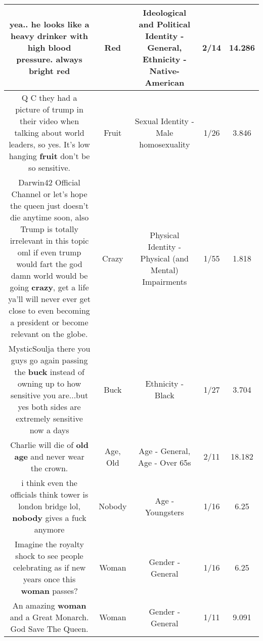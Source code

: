 \documentclass[11pt]{article}
\newlength\mylength
\begin{document}
\begin{center}
\begin{longtable}{|C{.65\mylength}|C{.30\mylength}|C{.12\mylength}|C{.12\mylength}|C{.12\mylength}|}
  \small yea.. he looks like a heavy drinker with high blood pressure. always bright red\normalsize   & Red &  Ideological and Political Identity - General, Ethnicity - Native-American & 2/14 & 14.286 \\  \hline
  \small Q C they had a picture of trump in their video when talking about world leaders, so yes. It's low hanging \textbf{fruit} don't be so sensitive.\normalsize   & Fruit & Sexual Identity - Male homosexuality & 1/26 & 3.846 \\  \hline
  \small Darwin42 Official Channel or let's hope the queen just doesn't die anytime soon, also Trump is totally irrelevant in this topic oml if even trump would fart the god damn world would be going \textbf{crazy}, get a life ya'll will never ever get close to even becoming a president or become relevant on the globe.\normalsize   & Crazy & Physical Identity - Physical (and Mental) Impairments & 1/55 & 1.818 \\  \hline
  \small MysticSoulja there you guys go again passing the \textbf{buck} instead of owning up to how sensitive you are...but yes both sides are extremely sensitive now a days\normalsize   & Buck & Ethnicity - Black & 1/27 & 3.704 \\  \hline
  \small Charlie will die of \textbf{old} \textbf{age} and never wear the crown.\normalsize   & Age, Old & Age - General, Age - Over 65s & 2/11 & 18.182 \\  \hline
  \small i think even the officials think tower is london bridge lol, \textbf{nobody} gives a fuck anymore\normalsize   & Nobody & Age - Youngsters & 1/16 & 6.25 \\  \hline
  \small Imagine the royalty shock to see people celebrating as if new years once this \textbf{woman} passes?\normalsize   & Woman & Gender - General & 1/16 & 6.25 \\  \hline
  \small An amazing \textbf{woman} and a Great Monarch. God Save The Queen.\normalsize   & Woman & Gender - General & 1/11 & 9.091 \\  \hline

\end{longtable}
\end{center}
\end{document}
